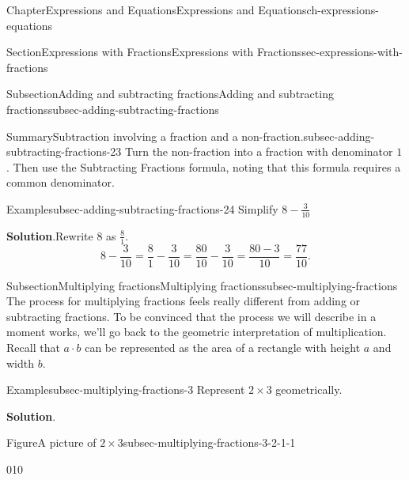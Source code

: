 \documentclass[twoside,11pt,]{book}
\newcommand{\blocktitlefont}{\relax}
\numberwithin{equation}{chapter}
\begin{document}
\begin{chapterptx}{Chapter}{Expressions and Equations}{}{Expressions and Equations}{}{}{ch-expressions-equations}
\begin{sectionptx}{Section}{Expressions with Fractions}{}{Expressions with Fractions}{}{}{sec-expressions-with-fractions}
\begin{subsectionptx}{Subsection}{Adding and subtracting fractions}{}{Adding and subtracting fractions}{}{}{subsec-adding-subtracting-fractions}
\begin{assemblage}{Summary}{Subtraction involving a fraction and a non-fraction.}{subsec-adding-subtracting-fractions-23}
Turn the non-fraction into a fraction with denominator \(1\). Then use the Subtracting Fractions formula, noting that this formula requires a common denominator.%
\end{assemblage}
\begin{example}{Example}{}{subsec-adding-subtracting-fractions-24}%
Simplify \(8 - \frac{3}{10}\)%
\par\smallskip%
\noindent\textbf{\blocktitlefont Solution}.\hypertarget{subsec-adding-subtracting-fractions-24-2}{}\quad{}Rewrite \(8\) as \(\frac81\).%
\begin{equation*}
8 - \frac{3}{10} = \frac81 - \frac{3}{10} = \frac{80}{10} - \frac{3}{10} = \frac{80-3}{10} = \frac{77}{10}.
\end{equation*}
%
\end{example}
\end{subsectionptx}
%
%
\typeout{************************************************}
\typeout{************************************************}
%
\begin{subsectionptx}{Subsection}{Multiplying fractions}{}{Multiplying fractions}{}{}{subsec-multiplying-fractions}
The process for multiplying fractions feels really different from adding or subtracting fractions. To be convinced that the process we will describe in a moment works, we'll go back to the geometric interpretation of multiplication. Recall that \(a \cdot b\) can be represented as the area of a rectangle with height \(a\) and width \(b\).%
\begin{example}{Example}{}{subsec-multiplying-fractions-3}%
Represent \(2 \times 3\) geometrically.%
\par\smallskip%
\noindent\textbf{\blocktitlefont Solution}.\hypertarget{subsec-multiplying-fractions-3-2}{}\quad{}\begin{figureptx}{Figure}{A picture of \(2 \times 3\)}{subsec-multiplying-fractions-3-2-1-1}{}%
\begin{image}{0}{1}{0}{}%
\end{image}
\end{figureptx}
\end{example}
\end{subsectionptx}
\end{sectionptx}
\end{chapterptx}
\end{document}
